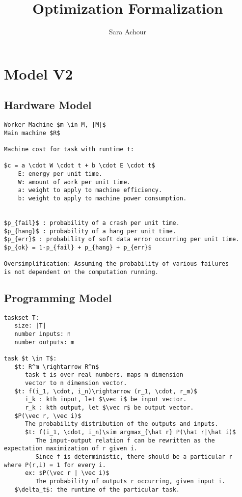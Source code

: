 \documentclass[11pt, oneside]{article}   	%
\title{Optimization Formalization}
\author{Sara Achour}
\begin{document}
\maketitle
\section {Model V2}
\subsection {Hardware Model}
\begin{lstlisting}[mathescape]
Worker Machine $m \in M, |M|$
Main machine $R$

Machine cost for task with runtime t:

$c = a \cdot W \cdot t + b \cdot E \cdot t$
	E: energy per unit time.
	W: amount of work per unit time.
	a: weight to apply to machine efficiency.
	b: weight to apply to machine power consumption.


$p_{fail}$ : probability of a crash per unit time.
$p_{hang}$ : probability of a hang per unit time.
$p_{err}$ : probability of soft data error occurring per unit time.
$p_{ok} = 1-p_{fail} + p_{hang} + p_{err}$

Oversimplification: Assuming the probability of various failures 
is not dependent on the computation running.
\end{lstlisting}
\subsection {Programming Model}
\begin{lstlisting}[mathescape]
taskset T:
   size: |T|
   number inputs: n
   number outputs: m
   
task $t \in T$:
   $t: R^m \rightarrow R^n$
      task t is over real numbers. maps m dimension 
      vector to n dimension vector.
   $t: f(i_1, \cdot, i_n)\rightarrow (r_1, \cdot, r_m)$
      i_k : kth input, let $\vec i$ be input vector.
      r_k : kth output, let $\vec r$ be output vector.
   $P(\vec r, \vec i)$
      The probability distribution of the outputs and inputs.
      $t: f(i_1, \cdot, i_n)\sim argmax_{\hat r} P(\hat r|\hat i)$
         The input-output relation f can be rewritten as the expectation maximization of r given i.
         Since f is deterministic, there should be a particular r where P(r,i) = 1 for every i.
      ex: $P(\vec r | \vec i)$
         The probability of outputs r occurring, given input i.
   $\delta_t$: the runtime of the particular task. 
\end{lstlisting}
\end{document}
